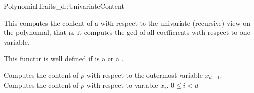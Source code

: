 \begin{ccRefConcept}{PolynomialTraits_d::UnivariateContent}

\ccDefinition

This  computes the content of a 
with respect to the univariate (recursive) view on the 
polynomial, that is, it computes the gcd of all 
coefficients  with respect to one variable. 

This functor is well defined if  is 
a  or a .

\ccRefines 
{}

\ccTypes

\ccGlue
{}\ccGlue

\ccOperations
{}
         {Computes the content of $p$ with respect to the outermost variable $x_{d-1}$. }
         {Computes the content of $p$ with respect to variable $x_i$. 
          \ccPrecond $0 \leq i  < d$
         }


\ccSeeAlso

\\

\end{ccRefConcept}
